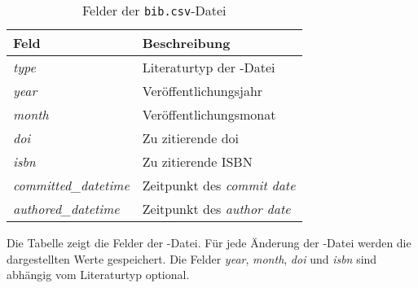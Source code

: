 \begin{table}
    \begin{tabularx}{\textwidth}{XL{10.2cm}}
        \toprule
        \textbf{Feld}              & \textbf{Beschreibung}                  \\ \midrule
        \emph{type}                & Literaturtyp der -Datei \\
        \emph{year}                & Veröffentlichungsjahr                  \\
        \emph{month}               & Veröffentlichungsmonat                 \\
        \emph{doi}                 & Zu zitierende \gls{doi}                \\
        \emph{isbn}                & Zu zitierende ISBN                     \\
        \emph{committed\_datetime} & Zeitpunkt des \emph{commit date}       \\
        \emph{authored\_datetime}  & Zeitpunkt des \emph{author date}       \\
        \bottomrule
    \end{tabularx}
    \caption{Felder der \texttt{bib.csv}-Datei}
    \label{tab:bib}
    \small
    Die Tabelle zeigt die Felder der -Datei. Für jede Änderung der -Datei werden die dargestellten Werte gespeichert. Die Felder \emph{year}, \emph{month}, \emph{doi} und \emph{isbn} sind abhängig vom Literaturtyp optional.
\end{table}
